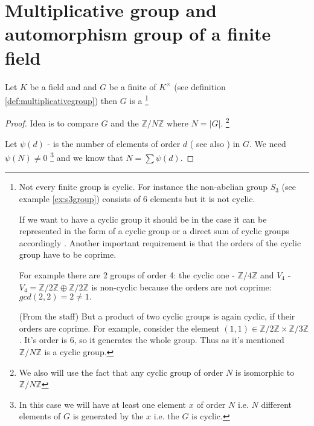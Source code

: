 \section{Multiplicative group and automorphism group of a finite
  field}
\begin{theorem}
  Let $K$ be a field and and $G$ be a finite  of
  $K^\times$ (see definition \ref{def:multiplicativegroup}) then $G$
  is a 
  \footnote{
    Not every finite group is cyclic. For instance the non-abelian
    group $S_3$ (see example \ref{ex:s3group}) consists of 6 elements
    but it is not cyclic.

    If we want to have a cyclic group it should be
     in the case it can be represented in
    the form of a cyclic group or a direct sum of cyclic groups
    accordingly . Another important requirement
    is that the orders of the cyclic group have to be coprime.

    For example there are 2 groups of order 4:
    the cyclic one - $\mathbb{Z}/4\mathbb{Z}$ and $V_4$ -
    $V_4 = \mathbb{Z}/2\mathbb{Z} \oplus \mathbb{Z}/2\mathbb{Z}$ is
    non-cyclic because the orders are not coprime: $gcd(2,2) = 2 \ne
    1.$  

    (From the staff) But a product of two
    cyclic groups is 
    again cyclic, if their orders are coprime. For example, consider
    the element $\left(1,1\right) \in \mathbb{Z}/2\mathbb{Z} \times
    \mathbb{Z}/3\mathbb{Z}$. It's order is 6, so it generates the 
    whole group. Thus as it's mentioned
    $\mathbb{Z}/N\mathbb{Z}$ is a cyclic group.
  }
  \begin{proof}
    Idea is to compare $G$ and the 
    $\mathbb{Z}/N\mathbb{Z}$ where $N = \left|G\right|$.
    \footnote{
      We also will use the fact that any cyclic group of order $N$ is
      isomorphic to $\mathbb{Z}/N\mathbb{Z}$
    }

    Let $\psi\left(d\right)$ - is the number of elements of order $d$
    ( see also ) in $G$. We need
    $\psi\left(N\right) \ne 0$
    \footnote{
      In this case we will have at least one element $x$ of order $N$
      i.e. $N$ different elements of $G$ is generated by the $x$
      i.e. the $G$ is cyclic.
    }
    and we know that
    $N = \sum \psi\left(d\right)$.
    

\end{proof}
\end{theorem}
